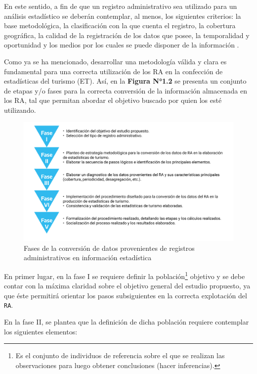 \documentclass[
]{book}
\begin{document}
En este sentido, a fin de que un registro administrativo sea utilizado para un análisis estadístico se deberán contemplar, al menos, los siguientes criterios: la base metodológica, la clasificación con la que cuenta el registro, la cobertura geográfica, la calidad de la registración de los datos que posee, la temporalidad y oportunidad y los medios por los cuales se puede disponer de la información \citep{inegi2006}.

Como ya se ha mencionado, desarrollar una metodología válida y clara es fundamental para una correcta utilización de los RA en la confección de estadísticas del turismo (ET). Así, en la \textbf{Figura N°1.2} se presenta un conjunto de etapas y/o fases para la correcta conversión de la información almacenada en los RA, tal que permitan abordar el objetivo buscado por quien los esté utilizando.

\begin{figure}

{\centering \includegraphics[width=1\linewidth]{imagenes/figura02} 

}

\caption{Fases de la conversión de datos provenientes de registros administrativos en información estadística}\label{fig:Fases}
\end{figure}

En primer lugar, en la fase I se requiere definir la población\footnote{Es el conjunto de individuos de referencia sobre el que se realizan las observaciones para luego obtener conclusiones (hacer inferencias).} objetivo y se debe contar con la máxima claridad sobre el objetivo general del estudio propuesto, ya que éste permitirá orientar los pasos subsiguientes en la correcta explotación del \texttt{RA}.

En la fase II, se plantea que la definición de dicha población requiere contemplar los siguientes elementos:
\end{document}
